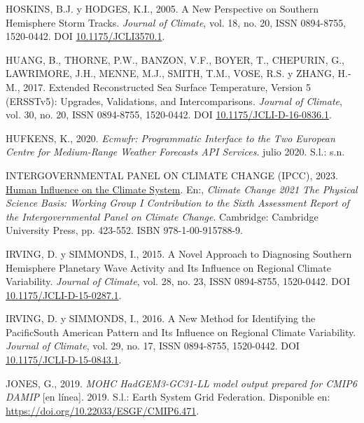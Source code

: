 \documentclass[12pt,oneside,a4paper]{reedthesis}
\newlength{\cslhangindent}
\newenvironment{CSLReferences}[2] %
 {%
  \setlength{\parindent}{0pt}
  \ifodd #1 \everypar{\setlength{\hangindent}{\cslhangindent}}\ignorespaces\fi
  \ifnum #2 > 0
  \setlength{\parskip}{#2\baselineskip}
  \fi
 }%
 {}
\begin{document}
\begin{CSLReferences}{1}{0}
\leavevmode{}%
HOSKINS, B.J. y HODGES, K.I., 2005. A {New Perspective} on {Southern Hemisphere Storm Tracks}. \emph{Journal of Climate}, vol. 18, no. 20, ISSN 0894-8755, 1520-0442. DOI \href{https://doi.org/10.1175/JCLI3570.1}{10.1175/JCLI3570.1}.

\leavevmode{}%
HUANG, B., THORNE, P.W., BANZON, V.F., BOYER, T., CHEPURIN, G., LAWRIMORE, J.H., MENNE, M.J., SMITH, T.M., VOSE, R.S. y ZHANG, H.-M., 2017. Extended {Reconstructed Sea Surface Temperature}, {Version} 5 ({ERSSTv5}): {Upgrades}, {Validations}, and {Intercomparisons}. \emph{Journal of Climate}, vol. 30, no. 20, ISSN 0894-8755, 1520-0442. DOI \href{https://doi.org/10.1175/JCLI-D-16-0836.1}{10.1175/JCLI-D-16-0836.1}.

\leavevmode{}%
HUFKENS, K., 2020. \emph{Ecmwfr: {Programmatic} Interface to the Two {European Centre} for {Medium-Range Weather Forecasts API} Services}. julio 2020. S.l.: s.n.

\leavevmode{}%
INTERGOVERNMENTAL PANEL ON CLIMATE CHANGE (IPCC), 2023. \href{https://doi.org/10.1017/9781009157896.005}{Human {Influence} on the {Climate System}}. En:, \emph{Climate {Change} 2021 {\textendash} {The Physical Science Basis}: {Working Group I Contribution} to the {Sixth Assessment Report} of the {Intergovernmental Panel} on {Climate Change}}. {Cambridge}: {Cambridge University Press}, pp. 423-552. ISBN 978-1-00-915788-9.

\leavevmode{}%
IRVING, D. y SIMMONDS, I., 2015. A {Novel Approach} to {Diagnosing Southern Hemisphere Planetary Wave Activity} and {Its Influence} on {Regional Climate Variability}. \emph{Journal of Climate}, vol. 28, no. 23, ISSN 0894-8755, 1520-0442. DOI \href{https://doi.org/10.1175/JCLI-D-15-0287.1}{10.1175/JCLI-D-15-0287.1}.

\leavevmode{}%
IRVING, D. y SIMMONDS, I., 2016. A {New Method} for {Identifying} the {Pacific}{\textendash}{South American Pattern} and {Its Influence} on {Regional Climate Variability}. \emph{Journal of Climate}, vol. 29, no. 17, ISSN 0894-8755, 1520-0442. DOI \href{https://doi.org/10.1175/JCLI-D-15-0843.1}{10.1175/JCLI-D-15-0843.1}.

\leavevmode{}%
JONES, G., 2019. \emph{MOHC HadGEM3-GC31-LL model output prepared for CMIP6 DAMIP} {[}en línea{]}. 2019. S.l.: Earth System Grid Federation. Disponible en: \url{https://doi.org/10.22033/ESGF/CMIP6.471}.


\end{CSLReferences}
\end{document}

